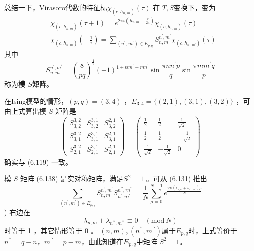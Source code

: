 总结一下，Virasoro代数的特征标$ \chi_{\left(c, h_{n, m}\right)}(\tau)$ 在 $T,S $变换下，变为
\begin{align} &\chi_{\left(c, h_{n, m}\right)}(\tau+1)=e^{2 \pi i\left(h_{n, m}-\frac{c}{24}\right)} \chi_{\left(c, h_{n, m}\right)}(\tau) \\ &\chi_{\left(c, h_{n, m}\right)}\left(-\frac{1}{\tau}\right)=\sum_{\left(n^{\prime}, m^{\prime}\right) \in E_{p, q}} S_{n, m}^{n^{\prime}, m^{\prime}} \chi_{\left(c, h_{n^{\prime}, m^{\prime}}\right)}(\tau) \end{align}
其中
\begin{equation}
	S_{n, m}^{n^{\prime}, m^{\prime}}=\left(\frac{8}{p q}\right)^{\frac{1}{2}}(-1)^{1+n m^{\prime}+m n^{\prime}} \sin \frac{\pi n n^{\prime} p}{q} \sin \frac{\pi m m^{\prime} q}{p} 
\end{equation}
称为\textbf{模 $S $矩阵}。

在Ising模型的情形，$ (p, q)=(3,4)$ ，$ E_{3,4}=\{(2,1),(3,1),(3,2)\}$ ，可由上式算出模 $S$ 矩阵是
\begin{equation}
	\left(\begin{array}{rrr} S_{3,2}^{3,2} & S_{3,2}^{3,1} & S_{3,2}^{2,1} \\ S_{3,1}^{3,2} & S_{3,1}^{3,1} & S_{3,1}^{2,1} \\ S_{2,1}^{3,2} & S_{2,1}^{3,1} & S_{2,1}^{2,1} \end{array}\right)=\left(\begin{array}{ccc} \frac{1}{2} & \frac{1}{2} & \frac{1}{\sqrt{2}} \\ \frac{1}{2} & \frac{1}{2} & -\frac{1}{\sqrt{2}} \\ \frac{1}{\sqrt{2}} & -\frac{1}{\sqrt{2}} & 0 \end{array}\right)
\end{equation} 
确实与 (6.119) 一致。

模 $S$ 矩阵 (6.138) 是实对称矩阵，满足$ S^{2}=1$ 。可从 (6.131) 推出
\begin{equation}
	\sum_{\left(n^{\prime}, m^{\prime}\right) \in E_{p, q}} S_{n, m}^{n^{\prime}, m^{\prime}} S_{n^{\prime}, m^{\prime}}^{n^{\prime \prime}, m^{\prime \prime}}=\frac{1}{N} \sum_{\mu=0}^{N-1} e^{\frac{2 \pi i\left(\lambda_{n, m}+\lambda_{n^{\prime \prime}, m^{\prime \prime}}\right) \mu}{N}} 
\end{equation})
右边在
\begin{equation}
	\lambda_{n, m}+\lambda_{n^{\prime \prime}, m^{\prime \prime}} \equiv 0 \quad(\text{mod}\ N)
\end{equation}
时等于 1 ，其它情形等于 0 。 $(n, m),\left(n^{\prime \prime}, m^{\prime \prime}\right) $属于$ E_{p, q} $时，上式等价于 $n^{\prime \prime}=q-n $，$ m^{\prime \prime}=p-m $，由此知道在$ E_{p, q} $中矩阵 $S^{2}=1 $。

